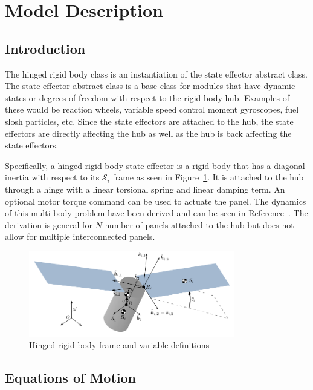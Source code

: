 \section{Model Description}

\subsection{Introduction}

The hinged rigid body class is an instantiation of the state effector abstract class. The state effector abstract class is a base class for modules that have dynamic states or degrees of freedom with respect to the rigid body hub. Examples of these would be reaction wheels, variable speed control moment gyroscopes, fuel slosh particles, etc. Since the state effectors are attached to the hub, the state effectors are directly affecting the hub as well as the hub is back affecting the state effectors.

Specifically, a hinged rigid body state effector is a rigid body that has a diagonal inertia with respect to its $\mathcal{S}_i$ frame as seen in Figure~\ref{fig:FlexFigure}. It is attached to the hub through a hinge with a linear torsional spring and linear damping term.  An optional motor torque command can be used to actuate the panel.  The dynamics of this multi-body problem have been derived and can be seen in Reference~. The derivation is general for $N$ number of panels attached to the hub but does not allow for multiple interconnected panels. 

\begin{figure}[htbp]
	\centerline{
		\includegraphics[width=0.8\textwidth]{Figures/Fig4_4_2}}
	\caption{Hinged rigid body frame and variable definitions}
	\label{fig:FlexFigure}
\end{figure}

\subsection{Equations of Motion}

